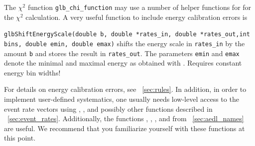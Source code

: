 The $\chi^2$ function {\tt glb\_chi\_function} may use a number of helper functions for
for the $\chi^2$ calculation. 
A very useful function to include energy calibration errors is
\begin{function}
{\tt glbShiftEnergyScale(double b, double *rates\_in, double *rates\_out,int bins, double emin, double emax)}
shifts the energy scale in {\tt rates\_in} by the amount {\tt b} and stores the result in 
{\tt rates\_out}. The parameters {\tt emin} and {\tt emax} denote the minimal and maximal energy
as obtained with . Requires constant energy bin widths!
\end{function}
For details on energy calibration errors, see \Sec~\ref{sec:rules}.
%
In addition, in order to implement user-defined systematics, one usually needs low-level access to the event rate vectors using , ,  and possibly other functions described in \Sec~\ref{sec:event_rates}. Additionally, the
functions , , , and  from \Sec~\ref{sec:aedl_names} are useful.  We recommend that you familiarize yourself with these functions at this point.

